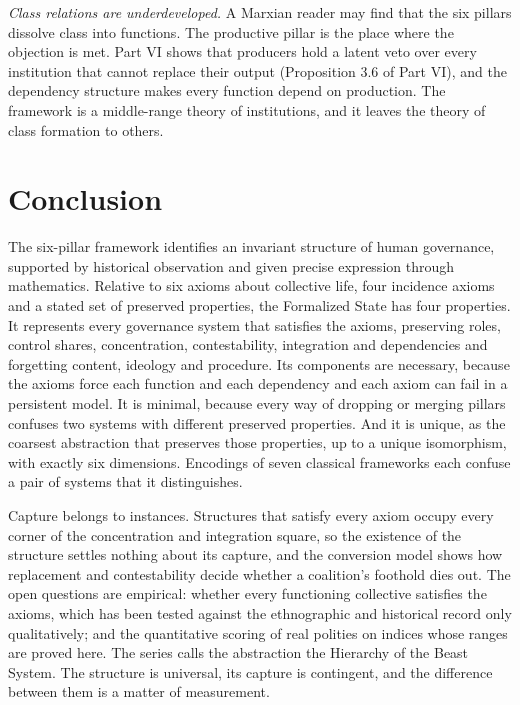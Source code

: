 \documentclass[11pt,letterpaper]{article}
\theoremstyle{definition}
\theoremstyle{remark}
\begin{document}
\emph{Class relations are underdeveloped.} A Marxian reader may find that the six pillars dissolve class into functions. The productive pillar is the place where the objection is met. Part VI shows that producers hold a latent veto over every institution that cannot replace their output (Proposition 3.6 of Part VI), and the dependency structure makes every function depend on production. The framework is a middle-range theory of institutions, and it leaves the theory of class formation to others.

\section{Conclusion}
\label{sec:conclusion}

The six-pillar framework identifies an invariant structure of human governance, supported by historical observation and given precise expression through mathematics. Relative to six axioms about collective life, four incidence axioms and a stated set of preserved properties, the Formalized State has four properties. It represents every governance system that satisfies the axioms, preserving roles, control shares, concentration, contestability, integration and dependencies and forgetting content, ideology and procedure. Its components are necessary, because the axioms force each function and each dependency and each axiom can fail in a persistent model. It is minimal, because every way of dropping or merging pillars confuses two systems with different preserved properties. And it is unique, as the coarsest abstraction that preserves those properties, up to a unique isomorphism, with exactly six dimensions. Encodings of seven classical frameworks each confuse a pair of systems that it distinguishes.

Capture belongs to instances. Structures that satisfy every axiom occupy every corner of the concentration and integration square, so the existence of the structure settles nothing about its capture, and the conversion model shows how replacement and contestability decide whether a coalition's foothold dies out. The open questions are empirical: whether every functioning collective satisfies the axioms, which has been tested against the ethnographic and historical record only qualitatively; and the quantitative scoring of real polities on indices whose ranges are proved here. The series calls the abstraction the Hierarchy of the Beast System. The structure is universal, its capture is contingent, and the difference between them is a matter of measurement.
\end{document}
